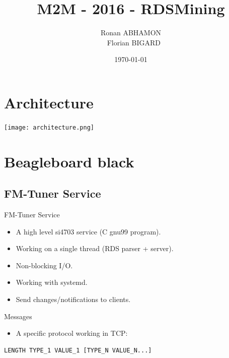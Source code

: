 \documentclass{beamer}
\title{M2M - 2016 - RDSMining}
\author{Ronan ABHAMON \\~ Florian BIGARD}
\institute{Université Joseph Fourier}
\date{\today}
\begin{document}
\begin{frame}
	\titlepage
\end{frame}

\section{Architecture}
\begin{frame}
	\begin{center}
		\texttt{[image: architecture.png]}
	\end{center}
\end{frame}

\section{Beagleboard black}

\subsection{FM-Tuner Service}

\begin{frame}[fragile]
	\begin{block}{FM-Tuner Service}
		\begin{itemize}
			\item A high level si4703 service (C gnu99 program).
			\item Working on a single thread (RDS parser + server).
			\item Non-blocking I/O.
			\item Working with systemd.
			\item Send changes/notifications to clients.
		\end{itemize}
	\end{block}
	\begin{block}{Messages}
		\begin{itemize}
			\item A specific protocol working in TCP:
		\end{itemize}
		\begin{center}
			\begin{minipage}{10cm}
				\begin{verbatim}
LENGTH TYPE_1 VALUE_1 [TYPE_N VALUE_N...]
				\end{verbatim}
			\end{minipage}
		\end{center}
	\end{block}
\end{frame}
\end{document}
